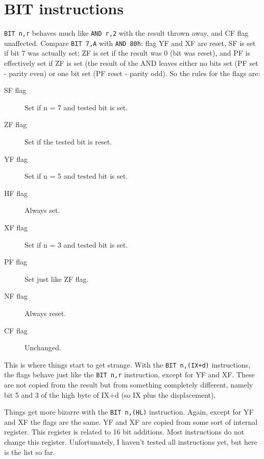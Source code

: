 \documentclass[oneside,a4paper]{book}
\begin{document}
\section{BIT instructions}
\label{bit_flags}

{\tt BIT n,r} behaves much like {\tt AND r,2{}} with 
the result thrown away, and CF flag unaffected. Compare {\tt BIT 7,A} 
with {\tt AND 80h}: flag YF and XF are reset, SF is set if bit 7 was
actually set; ZF is set if the result was 0 (bit was reset), and PF is
effectively set if ZF is set (the result of the AND leaves either no
bits set (PF set - parity even) or one bit set (PF reset - parity odd). 
So the rules for the flags are:

\begin{description}

\item[SF flag]
  Set if n = 7 and tested bit is set.

\item[ZF flag]
  Set if the tested bit is reset.

\item[YF flag]
  Set if n = 5 and tested bit is set.

\item[HF flag]
  Always set.

\item[XF flag]
  Set if n = 3 and tested bit is set.

\item[PF flag]
  Set just like ZF flag.

\item[NF flag]
  Always reset. 

\item[CF flag]
  Unchanged.

\end{description}

This is where things start to get strange. With the {\tt BIT n,(IX+d)}
instructions, the flags behave just like the 
{\tt BIT n,r} instruction, except for YF and XF. These are not copied 
from the result but from something completely different, namely bit 5 and
3 of the high byte of IX+d (so IX plus the displacement).

Things get more bizarre with the {\tt BIT n,(HL)} instruction. Again,
except for YF and XF the flags are the same. YF and XF are copied from
some sort of internal register. This register is related to 16 bit 
additions. Most instructions do not change this register. Unfortunately, 
I haven't tested all instructions yet, but here is the list so far.
\end{document}
